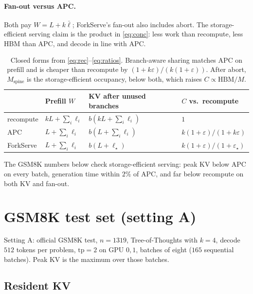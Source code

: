 \documentclass[11pt,a4paper]{article}
\begin{document}
\paragraph{Fan-out versus APC.}
Both pay $W=L+k\bar\ell$; ForkServe's fan-out also includes abort.
The storage-efficient serving claim is the product in \eqref{eq:conc}: less work than recompute, less HBM than APC, and decode in line with APC.

\begin{table}[h]
\centering
\small
\begin{tabular}{@{}l
>{\raggedright\arraybackslash}p{}
>{\raggedright\arraybackslash}p{}
>{\raggedright\arraybackslash}p{}@{}}
\toprule
 & Prefill $W$ & KV after unused branches & $C$ vs.\ recompute \\
\midrule
recompute & $kL+\sum_i\ell_i$ & $b(kL+\sum_i\ell_i)$ & $1$ \\
APC & $L+\sum_i\ell_i$ & $b(L+\sum_i\ell_i)$ & $k(1+\varepsilon)/(1+k\varepsilon)$ \\
ForkServe & $L+\sum_i\ell_i$ & $b(L+\ell_{\star})$ & $k(1+\varepsilon)/(1+\varepsilon_{\star})$ \\
\bottomrule
\end{tabular}
\caption{Closed forms from \eqref{eq:rec}--\eqref{eq:ratios}.
Branch-aware sharing matches APC on prefill and is cheaper than recompute by $(1+k\varepsilon)/(k(1+\varepsilon))$.
After abort, $M_{\mathrm{spine}}$ is the storage-efficient occupancy, below both, which raises $C\propto\mathrm{HBM}/M$.}
\end{table}

The GSM8K numbers below check storage-efficient serving: peak KV below APC on every batch, generation time within $2\%$ of APC, and far below recompute on both KV and fan-out.

\section{GSM8K test set (setting A)}

Setting A: official GSM8K test, $n{=}1319$, Tree-of-Thoughts with $k{=}4$, decode $512$ tokens per problem, $\mathrm{tp}{=}2$ on GPU $0,1$, batches of eight ($165$ sequential batches).
Peak KV is the maximum over those batches.

\subsection{Resident KV}
\end{document}
